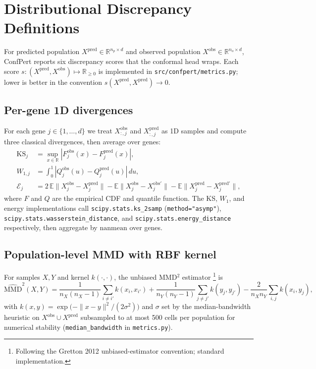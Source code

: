 \documentclass{article}
\begin{document}
\section{Distributional Discrepancy Definitions}
\label{app:metrics}

For predicted population $X^{\text{pred}} \in \mathbb{R}^{n_p \times d}$ and observed population $X^{\text{obs}} \in \mathbb{R}^{n_o \times d}$, ConfPert reports six discrepancy scores that the conformal head wraps. Each score $s \colon (X^{\text{pred}}, X^{\text{obs}}) \mapsto \mathbb{R}_{\geq 0}$ is implemented in \texttt{src/confpert/metrics.py}; lower is better in the convention $s(X^{\text{pred}}, X^{\text{pred}}) \to 0$.

\subsection{Per-gene 1D divergences}
For each gene $j \in \{1, \dots, d\}$ we treat $X^{\text{obs}}_{:, j}$ and $X^{\text{pred}}_{:, j}$ as 1D samples and compute three classical divergences, then average over genes:
\begin{align}
\mathrm{KS}_j     &= \sup_{x \in \mathbb{R}} |F^{\text{obs}}_j(x) - F^{\text{pred}}_j(x)|, \\
W_{1, j}          &= \int_0^1 |Q^{\text{obs}}_j(u) - Q^{\text{pred}}_j(u)|\, du, \\
\mathcal{E}_j     &= 2\,\mathbb{E}\|X^{\text{obs}}_j - X^{\text{pred}}_j\|
                     - \mathbb{E}\|X^{\text{obs}}_j - X^{\text{obs}'}_j\|
                     - \mathbb{E}\|X^{\text{pred}}_j - X^{\text{pred}'}_j\|,
\end{align}
where $F$ and $Q$ are the empirical CDF and quantile function. The KS, $W_1$, and energy implementations call \texttt{scipy.stats.ks\_2samp} (\texttt{method="asymp"}), \texttt{scipy.stats.wasserstein\_distance}, and \texttt{scipy.stats.energy\_distance} respectively, then aggregate by $\mathrm{nanmean}$ over genes.

\subsection{Population-level MMD with RBF kernel}
For samples $X, Y$ and kernel $k(\cdot, \cdot)$, the unbiased MMD$^2$ estimator \citep{bates2021}\footnote{Following the Gretton 2012 unbiased-estimator convention; standard implementation.} is
\begin{equation}
\widehat{\mathrm{MMD}}^2(X, Y) = \frac{1}{n_X(n_X - 1)} \sum_{i \neq i'} k(x_i, x_{i'}) + \frac{1}{n_Y(n_Y - 1)} \sum_{j \neq j'} k(y_j, y_{j'}) - \frac{2}{n_X n_Y} \sum_{i, j} k(x_i, y_j),
\end{equation}
with $k(x, y) = \exp\bigl(-\|x - y\|^2 / (2 \sigma^2)\bigr)$ and $\sigma$ set by the median-bandwidth heuristic on $X^{\text{obs}} \cup X^{\text{pred}}$ subsampled to at most 500 cells per population for numerical stability (\texttt{median\_bandwidth} in \texttt{metrics.py}).
\end{document}
